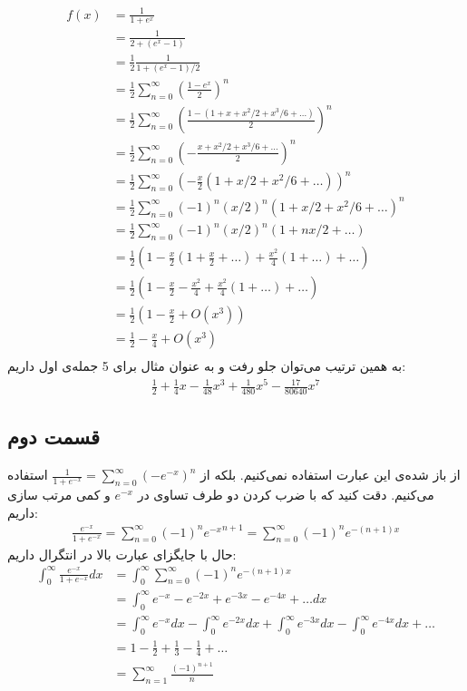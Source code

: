 \documentclass[]{article}
\begin{document}
\begin{align*}\\
    f(x)
    &=\frac{1}{1+e^x}\\
    &=\frac{1}{2+(e^x-1)}\\
    &=\frac12\frac{1}{1+(e^x-1)/2}\\
    &=\frac12\sum_{n=0}^{\infty}(\frac{1-e^x}{2})^n\\
    &=\frac12\sum_{n=0}^{\infty}(\frac{1-(1+x+x^2/2+x^3/6+\dots)}{2})^n\\
    &=\frac12\sum_{n=0}^{\infty}(-\frac{x+x^2/2+x^3/6+\dots}{2})^n\\
    &=\frac12\sum_{n=0}^{\infty}(-\frac{x}{2} (1+x/2+x^2/6+\dots))^n\\
    &=\frac12\sum_{n=0}^{\infty}(-1)^n(x/2)^n(1+x/2+x^2/6+\dots)^n\\
    &=\frac12\sum_{n=0}^{\infty}(-1)^n(x/2)^n(1+nx/2+\dots)\\
    &=\frac12\left(1-\frac{x}{2}(1+\frac{x}{2}+\dots)+\frac{x^2}{4}(1+\dots)+\dots\right)\\
    &=\frac12\left(1-\frac{x}{2}-\frac{x^2}{4} +\frac{x^2}{4}(1+\dots)+\dots\right)\\
    &=\frac12\left(1-\frac{x}{2}+O(x^3)\right)\\
    &=\frac12-\frac{x}{4}+O(x^3)\\
\end{align*}
به همین ترتیب می‌توان جلو رفت و به عنوان مثال برای 5 جمله‌ی اول داریم:
\begin{gather*}
    \boxed{\frac12+\frac{1}{4}x-\frac{1}{48}x^3 + \frac{1}{480}x^5 - \frac{17}{80640}x^7}
\end{gather*}
\subsection*{قسمت دوم}
از باز شده‌ی این عبارت استفاده نمی‌کنیم. بلکه از
$\frac{1}{1+e^{-x}} = \sum_{n=0}^{\infty} (-e^{-x})^n$
استفاده می‌کنیم. دقت کنید که با ضرب کردن دو طرف تساوی در
$e^{-x}$
و کمی مرتب سازی داریم:
\begin{gather*}
    \frac{e^{-x}}{1+e^{-x}} = \sum_{n=0}^{\infty} (-1)^n {e^{-x}}^{n+1} = \sum_{n=0}^{\infty} (-1)^n {e^{-(n+1)x}}
\end{gather*}
حال با جایگزای عبارت بالا در انتگرال داریم:
\begin{align*}
    \int_{0}^{\infty} \frac{e^{-x}}{1+e^{-x}} dx &= \int_{0}^{\infty} \sum_{n=0}^{\infty} (-1)^n {e^{-(n+1)x}}\\
    &= \int_{0}^{\infty} e^{-x} - e^{-2x} + e^{-3x} - e^{-4x} + \dots dx\\
    &= \int_{0}^{\infty} e^{-x} dx - \int_{0}^{\infty} e^{-2x} dx + \int_{0}^{\infty} e^{-3x} dx - \int_{0}^{\infty} e^{-4x} dx + \dots\\
    &= 1 - \frac{1}{2} + \frac{1}{3} - \frac{1}{4} + \dots\\
    &= \sum_{n=1}^{\infty} \frac{(-1)^{n+1}}{n}
\end{align*}
\end{document}
